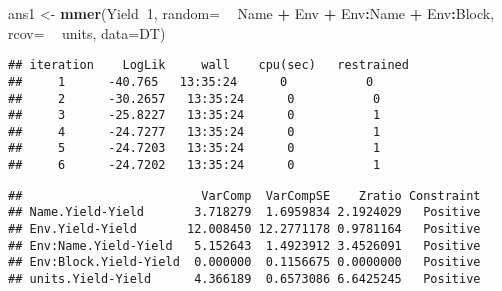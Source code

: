 \documentclass[]{article}
\newenvironment{Shaded}{\begin{snugshade}}{\end{snugshade}}
\newcommand{\KeywordTok}[1]{\textcolor[rgb]{0.13,0.29,0.53}{\textbf{#1}}}
\newcommand{\DataTypeTok}[1]{\textcolor[rgb]{0.13,0.29,0.53}{#1}}
\newcommand{\DecValTok}[1]{\textcolor[rgb]{0.00,0.00,0.81}{#1}}
\newcommand{\StringTok}[1]{\textcolor[rgb]{0.31,0.60,0.02}{#1}}
\newcommand{\OperatorTok}[1]{\textcolor[rgb]{0.81,0.36,0.00}{\textbf{#1}}}
\newcommand{\NormalTok}[1]{#1}
\begin{document}
\begin{Shaded}
\begin{Highlighting}[]
\NormalTok{ans1 <-}\StringTok{ }\KeywordTok{mmer}\NormalTok{(Yield}\OperatorTok{~}\DecValTok{1}\NormalTok{,}
             \DataTypeTok{random=} \OperatorTok{~}\StringTok{ }\NormalTok{Name }\OperatorTok{+}\StringTok{ }\NormalTok{Env }\OperatorTok{+}\StringTok{ }\NormalTok{Env}\OperatorTok{:}\NormalTok{Name }\OperatorTok{+}\StringTok{ }\NormalTok{Env}\OperatorTok{:}\NormalTok{Block,}
             \DataTypeTok{rcov=} \OperatorTok{~}\StringTok{ }\NormalTok{units,}
             \DataTypeTok{data=}\NormalTok{DT)}
\end{Highlighting}
\end{Shaded}

\begin{verbatim}
## iteration    LogLik     wall    cpu(sec)   restrained
##     1      -40.765   13:35:24      0           0
##     2      -30.2657   13:35:24      0           0
##     3      -25.8227   13:35:24      0           1
##     4      -24.7277   13:35:24      0           1
##     5      -24.7203   13:35:24      0           1
##     6      -24.7202   13:35:24      0           1
\end{verbatim}

\begin{Shaded}
\end{Shaded}

\begin{verbatim}
##                         VarComp  VarCompSE    Zratio Constraint
## Name.Yield-Yield       3.718279  1.6959834 2.1924029   Positive
## Env.Yield-Yield       12.008450 12.2771178 0.9781164   Positive
## Env:Name.Yield-Yield   5.152643  1.4923912 3.4526091   Positive
## Env:Block.Yield-Yield  0.000000  0.1156675 0.0000000   Positive
## units.Yield-Yield      4.366189  0.6573086 6.6425245   Positive
\end{verbatim}

\begin{Shaded}
\end{Shaded}
\end{document}

